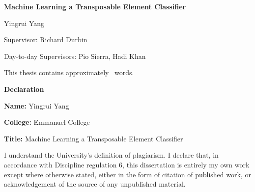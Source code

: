 \documentclass[12pt]{article}
\newcommand\wordcount{}
\begin{document}
\begin{titlepage}
    \centering
    \vspace*{2cm}
    
    {\LARGE\bfseries Machine Learning a Transposable Element Classifier\par}
    
    \vspace{3cm}
    
    {\Large Yingrui Yang\par}
    
    \vspace{3cm}
    
    {\large 
    Supervisor: Richard Durbin\par
    \vspace{0.5cm}
    Day-to-day Supervisors: Pio Sierra, Hadi Khan\par
    }
    
    \vfill
    
    {\normalsize This thesis contains approximately \wordcount\ words.\par}
    
    \vspace{1cm}
    
\end{titlepage}

\newpage
\thispagestyle{empty}

\vspace*{1cm}

\begin{center}
    {\Large\bfseries Declaration\par}
\end{center}

\vspace{1cm}

\noindent\textbf{Name:} Yingrui Yang

\vspace{0.5cm}

\noindent\textbf{College:} Emmanuel College

\vspace{0.5cm}

\noindent\textbf{Title:} Machine Learning a Transposable Element Classifier

\vspace{1.5cm}

\noindent I understand the University's definition of plagiarism. I declare that, in accordance with Discipline regulation 6, this dissertation is entirely my own work except where otherwise stated, either in the form of citation of published work, or acknowledgement of the source of any unpublished material.
\end{document}
